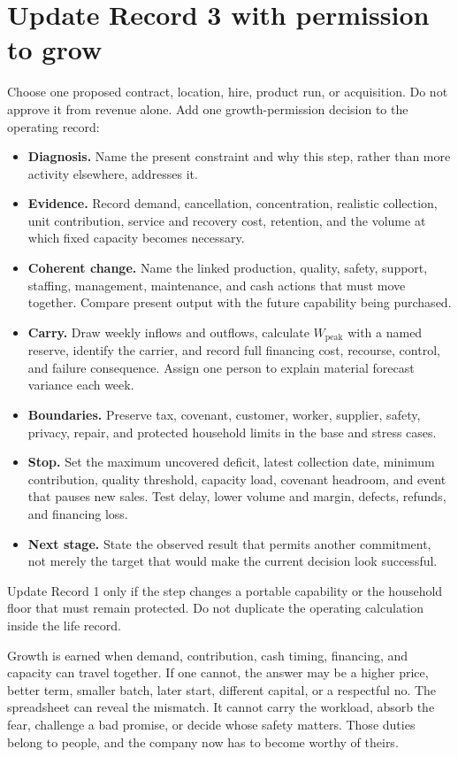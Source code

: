\section{Update Record 3 with permission to grow}

Choose one proposed contract, location, hire, product run, or acquisition. Do
not approve it from revenue alone. Add one growth-permission decision to the
operating record:

\begin{itemize}[leftmargin=0pt,label={},labelsep=0pt,itemsep=0.18em,
  parsep=0pt,topsep=0.35em]
\item \textbf{Diagnosis.} Name the present constraint and why this step, rather than
  more activity elsewhere, addresses it.
\item \textbf{Evidence.} Record demand, cancellation, concentration, realistic
  collection, unit contribution, service and recovery cost, retention, and the
  volume at which fixed capacity becomes necessary.
\item \textbf{Coherent change.} Name the linked production, quality, safety, support,
  staffing, management, maintenance, and cash actions that must move together.
  Compare present output with the future capability being purchased.
\item \textbf{Carry.} Draw weekly inflows and outflows, calculate
  \(W_{\mathrm{peak}}\) with a named reserve, identify the carrier, and record
  full financing cost, recourse, control, and failure consequence. Assign one
  person to explain material forecast variance each week.
\item \textbf{Boundaries.} Preserve tax, covenant, customer, worker, supplier, safety,
  privacy, repair, and protected household limits in the base and stress cases.
\item \textbf{Stop.} Set the maximum uncovered deficit, latest collection date, minimum
  contribution, quality threshold, capacity load, covenant headroom, and event
  that pauses new sales. Test delay, lower volume and margin, defects, refunds,
  and financing loss.
\item \textbf{Next stage.} State the observed result that permits another commitment,
  not merely the target that would make the current decision look successful.
\end{itemize}

Update Record 1 only if the step changes a portable capability or the household
floor that must remain protected. Do not duplicate the operating calculation
inside the life record.

Growth is earned when demand, contribution, cash timing, financing, and
capacity can travel together. If one cannot, the answer may be a higher price,
better term, smaller batch, later start, different capital, or a respectful no.
The spreadsheet can reveal the mismatch. It cannot carry the workload, absorb
the fear, challenge a bad promise, or decide whose safety matters. Those duties
belong to people, and the company now has to become worthy of theirs.
